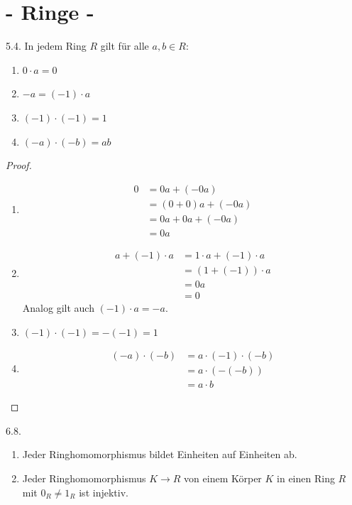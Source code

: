 \documentclass{article}
\newcommand{\ex}[1]{\tit{Übung} #1.}
\begin{document}
	\section*{\centering - Ringe -}
		\ex{5.4} In jedem Ring $R$ gilt für alle $a,b \in R$:
		\begin{enumerate}
			\item $0 \cdot a = 0$
			\item $-a = (-1) \cdot a$
			\item $(-1) \cdot (-1) = 1$
			\item $(-a) \cdot (-b) = ab$
		\end{enumerate}
		\begin{proof}
			\begin{enumerate}
				\item 
				\begin{align*}
					0 
					&= 0a + (-0a)\\ 
					&= (0 + 0)a + (-0a)\\
					&= 0a + 0a + (-0a)\\
					&= 0a
				\end{align*}
				\item
				\begin{align*}
					a + (-1) \cdot a 
					&= 1 \cdot a + (-1) \cdot a\\
					&= (1 + (-1)) \cdot a\\
					&= 0a\\
					&= 0
				\end{align*}
				Analog gilt auch $(-1) \cdot a = -a$.
				\item $(-1) \cdot (-1) = -(-1) = 1$
				\item 
				\begin{align*}
					(-a) \cdot (-b) 
					&= a \cdot (-1) \cdot (-b)\\
					&= a \cdot (-(-b))\\
					&= a \cdot b
				\end{align*}
			\end{enumerate}
		\end{proof}
		\ex{6.8} 
		\begin{enumerate}
			\item Jeder Ringhomomorphismus bildet Einheiten auf Einheiten ab.
			\item Jeder Ringhomomorphismus $K \to R$ von einem Körper $K$ in einen Ring $R$ mit $0_R \neq 1_R$ ist injektiv.
		\end{enumerate}
\end{document}
